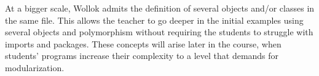 At a bigger scale, Wollok admits the definition of several objects and/or classes in the same file. 
This allows the teacher to go deeper in the initial examples using several objects and polymorphism without requiring the students to struggle with imports and packages.
These concepts will arise later in the course, when students' programs increase their complexity to a level that demands for modularization. 


%
%
%
%


